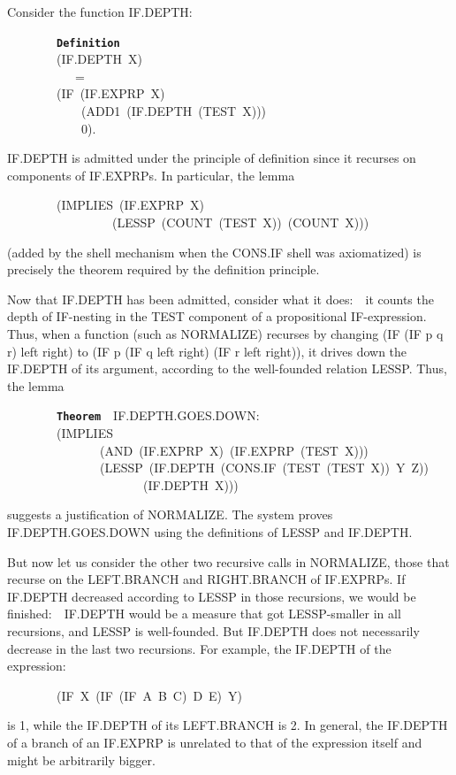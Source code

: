 \documentclass[11pt]{book}
\newenvironment{pubasis}{\begin{flushleft}\ttfamily\small}{\normalsize\rmfamily\end{flushleft}}
\newcommand{\axiomordefinition}[1]{\vspace{6pt}\texttt{\textbf{#1}}}
\begin{document}
Consider the function IF.DEPTH:
\begin{pubasis}
~~~~~~~~\axiomordefinition{Definition}\\
~~~~~~~~(IF.DEPTH~X)\\
~~~~~~~~~~~=\\
~~~~~~~~(IF~(IF.EXPRP~X)\\
~~~~~~~~~~~~(ADD1~(IF.DEPTH~(TEST~X)))\\
~~~~~~~~~~~~0).\\
\end{pubasis}
IF.DEPTH is admitted under the principle of definition since it recurses
on components of IF.EXPRPs.  In particular, the lemma
\begin{pubasis}
~~~~~~~~(IMPLIES~(IF.EXPRP~X)\\
~~~~~~~~~~~~~~~~~(LESSP~(COUNT~(TEST~X))~(COUNT~X)))\\
\end{pubasis}
(added by the shell mechanism when the CONS.IF shell
was axiomatized) is precisely the theorem required by the definition
principle.

Now that IF.DEPTH has been admitted, consider what it does:~~it counts the
depth of IF-nesting in the TEST component of a propositional
IF-expression.  Thus, when a function (such as NORMALIZE)
recurses by changing (IF (IF p q r) left right) to (IF p (IF q left right) (IF r left right)),
it drives down the IF.DEPTH of its argument, according to the well-founded
relation LESSP.  Thus, the lemma
\begin{pubasis}
~~~~~~~~\axiomordefinition{Theorem}~~IF.DEPTH.GOES.DOWN:\\
~~~~~~~~(IMPLIES\\
~~~~~~~~~~~~~~~(AND~(IF.EXPRP~X)~(IF.EXPRP~(TEST~X)))\\
~~~~~~~~~~~~~~~(LESSP~(IF.DEPTH~(CONS.IF~(TEST~(TEST~X))~Y~Z))\\
~~~~~~~~~~~~~~~~~~~~~~(IF.DEPTH~X)))\\
\end{pubasis}
suggests a justification of NOR\-MAL\-IZE.  The system proves IF.DEPTH.GOES.DOWN 
using the definitions of LESSP and IF.DEPTH.

But now let us consider the other two recursive calls in NORMALIZE,
those that recurse on the LEFT.BRANCH and RIGHT.BRANCH of
IF.EXPRPs.  If IF.DEPTH decreased according to LESSP in those recursions,
we would be finished:~~IF.DEPTH would be a measure that got
LESSP-smaller in all recursions, and LESSP is well-founded.
But IF.DEPTH does not necessarily decrease in the last two recursions.
For example, the IF.DEPTH of the expression:
\begin{pubasis}
~~~~~~~~(IF~X~(IF~(IF~A~B~C)~D~E)~Y)\\
\end{pubasis}
is 1, while the IF.DEPTH of its LEFT.BRANCH is 2.  In general, the IF.DEPTH
of a branch of an IF.EXPRP is unrelated to that of the expression itself
and might be arbitrarily bigger.
\end{document}
